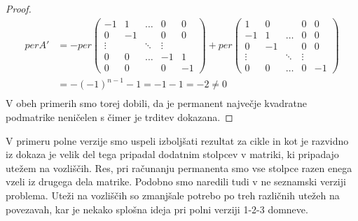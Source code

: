 \documentclass[12pt,a4paper,twoside]{article}
\theoremstyle{definition} %
\theoremstyle{plain} %
\numberwithin{equation}{section}  %
\begin{document}
\begin{proof}
\begin{equation*}
\begin{split}
 perA' &=-per\left( 
\begin{matrix} 
 -1 & 1 & \ldots & 0 & 0 \\ 
 0 & -1 &  & 0 & 0 \\ 
 \vdots &  & \ddots & \vdots &  \\ 
 0 & 0 & \ldots & -1 & 1 \\
 0 & 0 &  & 0 & -1 
\end{matrix} \right) 
+per\left( 
\begin{matrix} 
 1 & 0 &  & 0 & 0 \\
 -1 & 1 & \ldots & 0 & 0 \\  0 & -1 &  & 0 & 0 \\ 
  \vdots &  & \ddots & \vdots &  \\ 
 0 & 0 & \ldots & 0 & -1
\end{matrix} \right) \\
&=-(-1)^{n-1} -1 =  -1 - 1 = -2 \neq 0\\
\end{split}
\end{equation*}
V obeh primerih smo torej dobili, da je permanent največje kvadratne podmatrike neničelen s čimer je trditev dokazana.
\end{proof}
V primeru polne verzije smo uspeli izboljšati rezultat za cikle in kot je razvidno iz dokaza je velik del tega pripadal dodatnim stolpcev v matriki, ki pripadajo utežem na vozliščih. Res, pri računanju permanenta smo vse stolpce razen enega vzeli iz drugega dela matrike. Podobno smo naredili tudi v ne seznamski verziji problema. Uteži na vozliščih so zmanjšale potrebo po treh različnih utežeh na povezavah, kar je nekako splošna ideja pri polni verziji 1-2-3 domneve.
\end{document}

